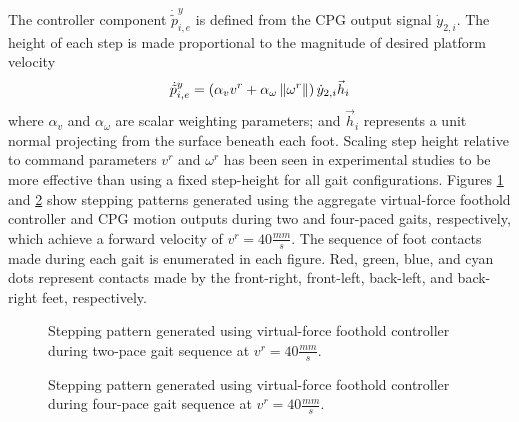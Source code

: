 		The controller component $\dot{\tilde{p}}_{i,e}^{y}$ is defined from the CPG output signal $\dot{y}_{2,i}$. The height of each step is made proportional to the magnitude of desired platform velocity
			\begin{equation}
				\dot{\tilde{p}}_{i,e}^{y} 	= { \left( \alpha_{v} v^{r} + \alpha_{\omega} \left\lVert\omega^{r}\right\rVert \right) \dot{y}_{2,i}} \vec{h}_{i} 
				\label{eq::foot_height_control}
			\end{equation}
		where $\alpha_{v}$ and $\alpha_{\omega}$ are scalar weighting parameters; and $\vec{h}_{i}$ represents a unit normal projecting from the surface beneath each \Ith foot. Scaling step height relative to command parameters $v^{r}$ and $\omega^{r}$ has been seen in experimental studies to be more effective than using a fixed step-height for all gait configurations. Figures \ref{fig::foot_motion2} and \ref{fig::foot_motion4} show stepping patterns generated using the aggregate virtual-force foothold controller and CPG motion outputs during two and four-paced gaits, respectively, which achieve a forward velocity of $v^{r}=40\frac{mm}{s}$. The sequence of foot contacts made during each gait is enumerated in each figure. Red, green, blue, and cyan dots represent contacts made by the front-right, front-left, back-left, and back-right feet, respectively.
%
			\begin{figure}[!h]
				\centering
				\caption{Stepping pattern generated using virtual-force foothold controller during two-pace gait sequence at $v^{r}=40\frac{mm}{s}$.}
				\label{fig::foot_motion2}
			\end{figure}
			\begin{figure}[!h]
				\centering
				\caption{Stepping pattern generated using virtual-force foothold controller during four-pace gait sequence at $v^{r}=40\frac{mm}{s}$.}
				\label{fig::foot_motion4}
			\end{figure}
